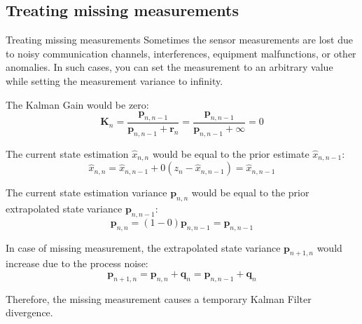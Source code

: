 \subsection{Treating missing measurements}
\begin{frame}{Treating missing measurements}
Sometimes the sensor measurements are lost due to noisy communication channels, interferences, equipment malfunctions, or other anomalies. In such cases, you can set the measurement to an arbitrary value while setting the measurement variance to infinity.

The Kalman Gain would be zero:
\[
\bm{K}_n = \frac{\bm{p}_{n,n-1}}{\bm{p}_{n,n-1} + \bm{r}_n} = \frac{\bm{p}_{n,n-1}}{\bm{p}_{n,n-1} + \infty} = 0
\]

The current state estimation \( \hat{x}_{n,n} \) would be equal to the prior estimate \( \hat{x}_{n,n-1} \):
\[
\hat{x}_{n,n} = \hat{x}_{n,n-1} + 0 (z_n - \hat{x}_{n,n-1}) = \hat{x}_{n,n-1}
\]

The current state estimation variance \( \bm{p}_{n,n} \) would be equal to the prior extrapolated state variance \( \bm{p}_{n,n-1} \):
\[
\bm{p}_{n,n} = (1 - 0) \bm{p}_{n,n-1} = \bm{p}_{n,n-1}
\]

In case of missing measurement, the extrapolated state variance \( \bm{p}_{n+1,n} \) would increase due to the process noise:
\[
\bm{p}_{n+1,n} = \bm{p}_{n,n} + \bm{q}_n = \bm{p}_{n,n-1} + \bm{q}_n
\]

Therefore, the missing measurement causes a temporary Kalman Filter divergence.
\end{frame}


